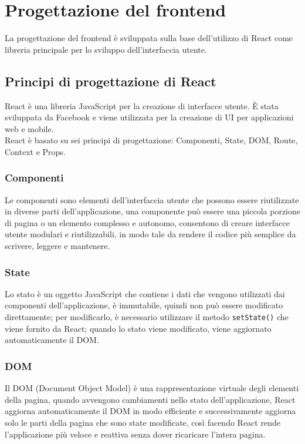 \section{Progettazione del frontend}
La progettazione del frontend è sviluppata sulla base dell'utilizzo di React come libreria principale per lo sviluppo dell'interfaccia utente.
\subsection{Principi di progettazione di React}
React è una libreria JavaScript per la creazione di interfacce utente. È stata sviluppata da Facebook e viene utilizzata per la creazione di UI per applicazioni web e mobile.\\
React è basato su sei principi di progettazione: Componenti, State, DOM, Route, Context e Props.\\
\subsubsection{Componenti}
Le componenti sono elementi dell'interfaccia utente che possono essere riutilizzate in diverse parti dell'applicazione, una componente può essere una piccola porzione di pagina o un elemento complesso e autonomo, consentono di creare interfacce utente modulari e riutilizzabili, in modo tale da rendere il codice più semplice da scrivere, leggere e mantenere.\\
\subsubsection{State}
Lo stato è un oggetto JavaScript che contiene i dati che vengono utilizzati dai componenti dell'applicazione, è immutabile, quindi non può essere modificato direttamente; per modificarlo, è necessario utilizzare il metodo \texttt{setState()} che viene fornito da React; quando lo stato viene modificato, viene aggiornato automaticamente il DOM.\\
\subsubsection{DOM}
Il DOM (Document Object Model) è una rappresentazione virtuale degli elementi della pagina, quando avvengono cambiamenti nello stato dell'applicazione, React aggiorna automaticamente il DOM in modo efficiente e successivamente aggiorna solo le parti della pagina che sono state modificate, così facendo React rende l'applicazione più veloce e reattiva senza dover ricaricare l'intera pagina.\\
